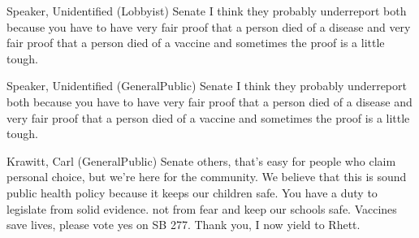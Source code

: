 \begin{result}{9.241784334021503}{Speaker, Unidentified (Lobbyist) Senate}
I think they probably underreport both because you have to have very fair proof that a person died of a disease and very fair proof that a person died of a vaccine and sometimes the proof is a little tough.
\end{result}

\begin{result}{9.241784334021503}{Speaker, Unidentified (GeneralPublic) Senate}
I think they probably underreport both because you have to have very fair proof that a person died of a disease and very fair proof that a person died of a vaccine and sometimes the proof is a little tough.
\end{result}

\begin{result}{9.212042150184399}{Krawitt, Carl (GeneralPublic) Senate}
others, that's easy for people who claim personal choice, but we're here for the community. We believe that this is sound public health policy because it keeps our children safe. You have a duty to legislate from solid evidence. not from fear and keep our schools safe. Vaccines save lives, please vote yes on SB 277. Thank you, I now yield to Rhett.
\end{result}

